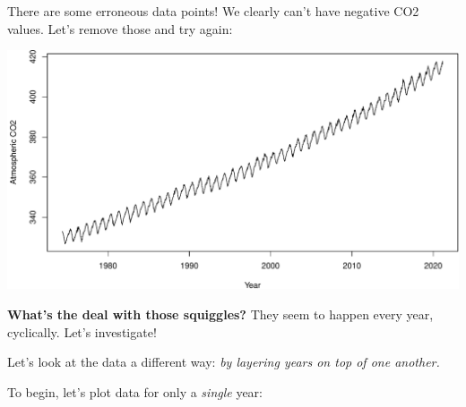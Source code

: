 \documentclass[
]{book}
\newenvironment{Shaded}{\begin{snugshade}}{\end{snugshade}}
\newcommand{\DataTypeTok}[1]{\textcolor[rgb]{0.13,0.29,0.53}{#1}}
\newcommand{\DecValTok}[1]{\textcolor[rgb]{0.00,0.00,0.81}{#1}}
\newcommand{\KeywordTok}[1]{\textcolor[rgb]{0.13,0.29,0.53}{\textbf{#1}}}
\newcommand{\NormalTok}[1]{#1}
\newcommand{\OperatorTok}[1]{\textcolor[rgb]{0.81,0.36,0.00}{\textbf{#1}}}
\newcommand{\StringTok}[1]{\textcolor[rgb]{0.31,0.60,0.02}{#1}}
\begin{document}
There are some erroneous data points! We clearly can't have negative CO2 values. Let's remove those and try again:

\begin{Shaded}
\end{Shaded}

\includegraphics{figures/unnamed-chunk-310-1.pdf}

\textbf{What's the deal with those squiggles?} They seem to happen every year, cyclically. Let's investigate!

Let's look at the data a different way: \emph{by layering years on top of one another.}

To begin, let's plot data for only a \emph{single} year:
\end{document}
